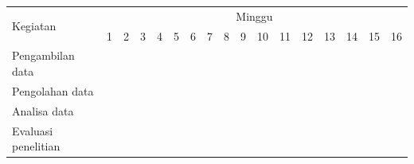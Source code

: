 \newcommand{\w}{}
\newcommand{\G}{\cellcolor{gray}}
\begin{table}[h!]
  \begin{tabular}{|p{3.5cm}|c|c|c|c|c|c|c|c|c|c|c|c|c|c|c|c|}

    \hline
    \multirow{2}{*}{Kegiatan} & \multicolumn{16}{|c|}{Minggu} \\
    \cline{2-17} &
    1 & 2 & 3 & 4 & 5 & 6 & 7 & 8 & 9 & 10 & 11 & 12 & 13 & 14 & 15 & 16 \\
    \hline

    Pengambilan data &
    \G & \G & \G & \G & \w & \w & \w & \w & \w & \w & \w & \w & \w & \w & \w & \w \\
    \hline

    Pengolahan data &
    \w & \w & \w & \w & \G & \G & \G & \G & \w & \w & \w & \w & \w & \w & \w & \w \\
    \hline

    Analisa data &
    \w & \w & \w & \w & \w & \w & \w & \w & \G & \G & \G & \G & \w & \w & \w & \w \\
    \hline

    Evaluasi penelitian &
    \w & \w & \w & \w & \w & \w & \w & \w & \w & \w & \w & \w & \G & \G & \G & \G \\
    \hline

  \end{tabular}
\end{table}
